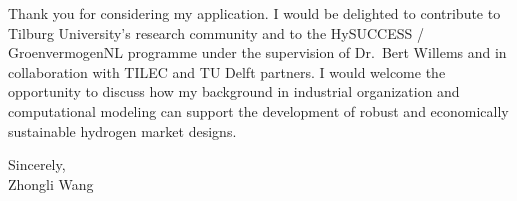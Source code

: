 \documentclass[11pt]{article}
\begin{document}
Thank you for considering my application. I would be delighted to contribute to Tilburg University’s research community and to the HySUCCESS / GroenvermogenNL programme under the supervision of Dr.\ Bert Willems and in collaboration with TILEC and TU Delft partners. I would welcome the opportunity to discuss how my background in industrial organization and computational modeling can support the development of robust and economically sustainable hydrogen market designs.

\vspace{0.5cm}

Sincerely,\\[0.8cm]
Zhongli Wang
\end{document}

